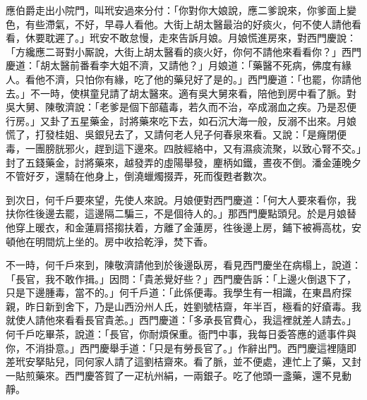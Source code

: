 應伯爵走出小院門，叫玳安過來分付：「你對你大娘說，應二爹說來，你爹面上變色，有些滯氣，不好，早尋人看他。大街上胡太醫最治的好痰火，{}何不使人請他看看，休要耽遲了。」玳安不敢怠慢，走來告訴月娘。月娘慌進房來，對西門慶說：「方纔應二哥對小厮說，大街上胡太醫看的痰火好，你何不請他來看看你？」西門慶道：「胡太醫前番看李大姐不濟，又請他？」月娘道：「藥醫不死病，佛度有緣人。看他不濟，只怕你有緣，吃了他的藥兒好了是的。」{}西門慶道：「也罷，你請他去。」不一時，使棋童兒請了胡太醫來。適有吳大舅來看，陪他到房中看了脈。對吳大舅、陳敬濟說：「老爹是個下部蘊毒，若久而不治，卒成溺血之疾。乃是忍便行房。」又卦了五星藥金，討將藥來吃下去，如石沉大海一般，反溺不出來。月娘慌了，打發桂姐、吳銀兒去了，又請何老人兒子何春泉來看。又說：「是癃閉便毒，一團膀胱邪火，趕到這下邊來。四肢經絡中，又有濕痰流聚，以致心腎不交。」{}封了五錢藥金，討將藥來，越發弄的虛陽舉發，麈柄如鐵，晝夜不倒。潘金蓮晚夕不管好歹，還騎在他身上，倒澆蠟燭掇弄，死而復甦者數次。{}

到次日，何千戶要來望，先使人來說。月娘便對西門慶道：「何大人要來看你，我扶你徃後邊去罷，{}這邊隔二騙三，不是個待人的。」那西門慶點頭兒。於是月娘替他穿上暖衣，和金蓮肩搭搊扶着，方離了金蓮房，徃後邊上房，鋪下被褥高枕，安頓他在明間炕上坐的。房中收拾乾淨，焚下香。

不一時，何千戶來到，陳敬濟請他到於後邊臥房，看見西門慶坐在病榻上，說道：「長官，我不敢作揖。」因問：「貴恙覺好些？」西門慶告訴：「上邊火倒退下了，只是下邊腫毒，當不的。」何千戶道：「此係便毒。我學生有一相識，在東昌府探親，昨日新到舍下，乃是山西汾州人氏，姓劉號桔齋，年半百，極看的好瘡毒。我就使人請他來看看長官貴恙。」西門慶道：「多承長官費心，我這裡就差人請去。」何千戶吃畢茶，說道：「長官，你耐煩保重。衙門中事，我每日委答應的遞事件與你，不消掛意。」西門慶舉手道：「只是有勞長官了。」作辭出門。西門慶這裡隨即差玳安拏貼兒，同何家人請了這劉桔齋來。看了脈，並不便處，連忙上了藥，又封一貼煎藥來。西門慶答賀了一疋杭州絹，一兩銀子。吃了他頭一盞藥，還不見動靜。

